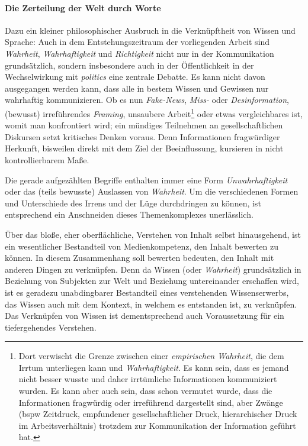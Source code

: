 \paragraph{Die Zerteilung der Welt durch Worte}
Dazu ein kleiner philosophischer Ausbruch in die Verknüpftheit von Wissen und Sprache: Auch in dem Entstehungszeitraum der vorliegenden Arbeit sind \emph{Wahrheit}, \emph{Wahrhaftigkeit} und \emph{Richtigkeit} nicht nur in der Kommunikation grundsätzlich, sondern insbesondere auch in der Öffentlichkeit in der Wechselwirkung mit \emph{politics} eine zentrale Debatte. Es kann nicht davon ausgegangen werden kann, dass alle in bestem Wissen und Gewissen nur wahrhaftig kommunizieren. 
Ob es nun \emph{Fake-News}, \emph{Miss-} oder \emph{Desinformation}, (bewusst) irreführendes \emph{Framing}, unsaubere Arbeit\footnote{
    Dort verwischt die Grenze zwischen einer \emph{empirischen Wahrheit}, die dem Irrtum unterliegen kann und \emph{Wahrhaftigkeit}. Es kann sein, dass es jemand nicht besser wusste und daher irrtümliche Informationen kommuniziert wurden. Es kann aber auch sein, dass schon vermutet wurde, dass die Informationen fragwürdig oder irreführend dargestellt sind, aber Zwänge (\gls{bspw} Zeitdruck, empfundener gesellschaftlicher Druck, hierarchischer Druck im Arbeitsverhältnis) trotzdem zur Kommunikation der Information geführt hat.} 
oder etwas vergleichbares ist, womit man konfrontiert wird; ein mündiges Teilnehmen an gesellschaftlichen Diskursen setzt kritisches Denken voraus. Denn Informationen fragwürdiger Herkunft, bisweilen direkt mit dem Ziel der Beeinflussung, kursieren in nicht kontrollierbarem Maße. 

Die gerade aufgezählten Begriffe enthalten immer eine Form \emph{Unwahrhaftigkeit} oder das (teils bewusste) Auslassen von \emph{Wahrheit}. Um die verschiedenen Formen und Unterschiede des Irrens und der Lüge durchdringen zu können, ist entsprechend ein Anschneiden dieses Themenkomplexes unerlässlich.  

Über das bloße, eher oberflächliche, Verstehen von Inhalt selbst hinausgehend, ist ein wesentlicher Bestandteil von Medienkompetenz, den Inhalt bewerten zu können. In diesem Zusammenhang soll bewerten bedeuten, den Inhalt mit anderen Dingen zu verknüpfen. Denn da Wissen (oder \emph{Wahrheit}) grundsätzlich in Beziehung von Subjekten zur Welt und Beziehung untereinander erschaffen wird, ist es geradezu unabdingbarer Bestandteil eines verstehenden Wissenserwerbs, das Wissen auch mit dem Kontext, in welchem es entstanden ist, zu verknüpfen. Das Verknüpfen von Wissen ist dementsprechend auch Voraussetzung für ein tiefergehendes Verstehen. 

